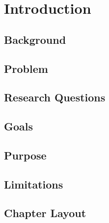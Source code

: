 \documentclass[12pt,
               a4,
               twoside,
               openright]{book} %
\begin{document}
  
    \frontmatterDSV %
    
    \tableofcontents
    
    
    
    \chapter{Introduction}
    \label{chap:introduction}
    
    \section{Background}
    \label{sec:background}
    

    \section{Problem}
    \label{sec:problem}    
    
    
    \section{Research Questions}
    \label{sec:resq}
    
    
    \section{Goals}
    \label{sec:resq}
    
    
    \section{Purpose}
    \label{sec:resq}
    
    
    \section{Limitations}
    \label{sec:resq}
    
    
    \section{Chapter Layout}
    \label{sec:resq}
    
    
\end{document}
